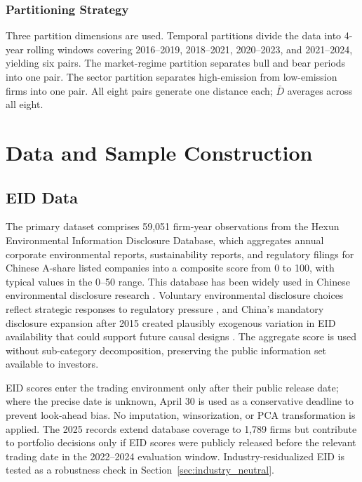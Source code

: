 \documentclass[12pt]{article}
\begin{document}
\subsubsection{Partitioning Strategy}

Three partition dimensions are used. Temporal partitions divide the
data into 4-year rolling windows covering 2016--2019, 2018--2021,
2020--2023, and 2021--2024, yielding six pairs. The market-regime
partition separates bull and bear periods into one pair. The sector
partition separates high-emission from low-emission firms into one pair.
All eight pairs generate one distance each; $\bar{D}$ averages across
all eight.

\section{Data and Sample Construction}
\label{sec:data}

\subsection{EID Data}

The primary dataset comprises 59,051 firm-year observations from the
Hexun Environmental Information Disclosure Database, which aggregates
annual corporate environmental reports, sustainability reports, and
regulatory filings for Chinese A-share listed companies into a
composite score from 0 to 100, with typical values in the 0--50 range. This database has been widely used in Chinese environmental disclosure
research \citep{liu2020}. Voluntary environmental disclosure choices
reflect strategic responses to regulatory pressure
\citep{clarkson2011voluntary}, and China's mandatory disclosure
expansion after 2015 created plausibly exogenous variation in EID
availability that could support future causal designs
\citep{cai2016corporate}. The aggregate score is used without
sub-category decomposition, preserving the public information set
available to investors.

EID scores enter the trading environment only after their public release date; where the precise date is unknown, April 30 is used as a conservative deadline to prevent look-ahead bias. No imputation, winsorization, or PCA transformation is applied. The 2025 records extend database coverage to 1,789 firms but contribute to portfolio decisions only if EID scores were publicly released before the relevant trading date in the 2022--2024 evaluation window. Industry-residualized EID is tested as a robustness check in Section~\ref{sec:industry_neutral}.
\end{document}
